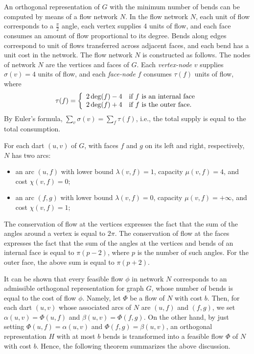 \documentclass{article}
\newcommand{\ph}{\frac{\pi}{2}}
\begin{document}
\medskip


An orthogonal representation of $G$ with the minimum number of bends can be computed by means of a flow network $N$. In the flow network $N$, each unit of flow corresponds to a $\ph$ angle, each vertex supplies 4 units of flow, and each face consumes an amount of flow proportional to its degree. Bends along edges correspond to unit of flows transferred across adjacent faces, and each bend has a unit cost in the network. The flow network $N$ is constructed as follows. The nodes of network $N$ are the vertices and faces of $G$.  Each \emph{vertex-node} $v$ supplies $\sigma(v)=4$ units of flow, and each \emph{face-node} $f$ consumes $\tau(f)$ units of flow, where
\[
\tau(f) =   \left\{ \begin{array}{l l}
        2 \deg(f) - 4  & \mbox{if $f$ is an internal face}\\
        2 \deg(f) + 4  & \mbox{if $f$ is the outer face.}
        \end{array} \right.
\]
By Euler's formula, $\sum_v \sigma(v) = \sum_f \tau(f)$, i.e., the total supply is equal to the total consumption.

\noindent For each dart $(u,v)$ of $G$, with faces $f$ and $g$ on its left and right, respectively, $N$ has two arcs:
\begin{itemize}
    \item an arc $(u,f)$ with lower bound $\lambda(v,f)=1$, capacity $\mu(v,f)=4$, and cost $\chi(v,f)=0$;
    \item an arc $(f,g)$ with lower bound $\lambda(v,f)=0$, capacity $\mu(v,f)=+\infty$, and cost $\chi(v,f)=1$;
\end{itemize}

The conservation of flow at the vertices expresses the fact that the sum of the angles around a vertex is equal to $2 \pi$.  The conservation of flow at the faces expresses the fact that the sum of the angles at the vertices and bends of an internal face is equal to $\pi (p-2)$, where $p$ is the number of such angles.  For the outer face, the above sum is equal to $\pi(p+2)$.

It can be shown that every feasible flow $\phi$ in network $N$ corresponds to an admissible orthogonal representation for graph $G$, whose number of bends is equal to the cost of flow $\phi$.  Namely, let $\Phi$ be a flow of $N$ with cost $b$. Then, for each dart $(u,v)$  whose associated arcs of $N$ are $(u,f)$ and $(f,g)$, we set $\alpha(u,v)=\Phi(u,f)$ and $\beta(u,v) = \Phi(f,g)$. On the other hand, by just setting $\Phi(u,f)=\alpha(u,v)$ and $\Phi(f,g)=\beta(u,v)$, an orthogonal representation $H$ with at most $b$ bends is transformed into a feasible flow $\Phi$ of $N$ with cost $b$. Hence, the following theorem summarizes the above discussion.
\end{document}
